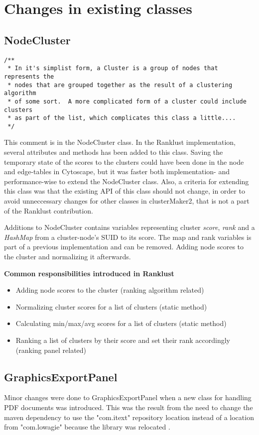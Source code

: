 \section{Changes in existing classes}
\subsection{NodeCluster}
\begin{verbatim}
/**
 * In it's simplist form, a Cluster is a group of nodes that represents the
 * nodes that are grouped together as the result of a clustering algorithm
 * of some sort.  A more complicated form of a cluster could include clusters
 * as part of the list, which complicates this class a little....
 */
\end{verbatim}

This comment is in the NodeCluster class. In the Ranklust implementation,
several attributes and methods has been added to this class. Saving the
temporary state of the scores to the clusters could have been done in the node
and edge-tables in Cytoscape, but it was faster both implementation- and
performance-wise to extend the NodeCluster class. Also, a criteria for extending
this class was that the existing API of this class should not change, in order
to avoid unneccessary changes for other classes in clusterMaker2, that is not
a part of the Ranklust contribution. 

Additions to NodeCluster contains variables representing cluster \textit{score},
\textit{rank} and a \textit{HashMap} from a cluster-node's SUID to its score.
The map and rank variables is part of a previous implementation and can be
removed. Adding node scores to the cluster and normalizing it afterwards.

\textbf{Common responsibilities introduced in Ranklust}

\begin{itemize}
    \item Adding node scores to the cluster (ranking algorithm related)
    \item Normalizing cluster scores for a list of clusters (static method)
    \item Calculating min/max/avg scores for a list of clusters (static method)
    \item Ranking a list of clusters by their score and set their rank
        accordingly (ranking panel related)
\end{itemize}

\subsection{GraphicsExportPanel}
Minor changes were done to GraphicsExportPanel when a new class for handling PDF
documents was introduced. This was the result from the need to change the maven
dependency to use the "com.itext"\cite{itext} repository location instead of
a location from "com.lowagie" because the library was relocated
\cite{lowagie-to-itext}.

